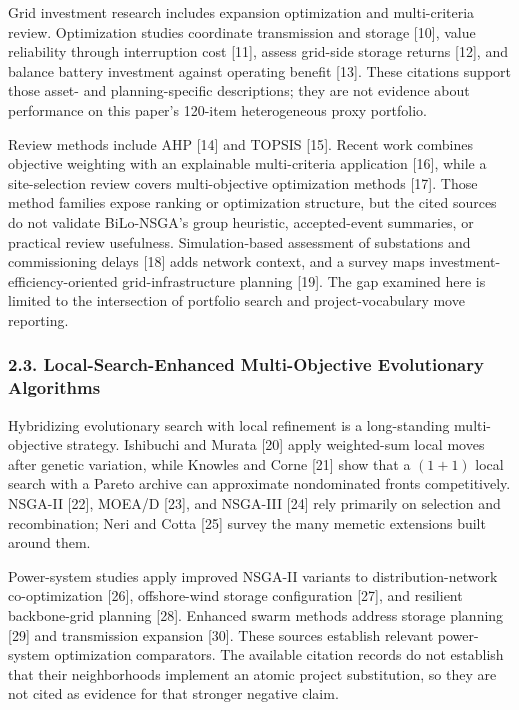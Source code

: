 \documentclass[
]{article}
\begin{document}
Grid investment research includes expansion optimization and multi-criteria review. Optimization studies coordinate transmission and storage {[}10{]}, value reliability through interruption cost {[}11{]}, assess grid-side storage returns {[}12{]}, and balance battery investment against operating benefit {[}13{]}. These citations support those asset- and planning-specific descriptions; they are not evidence about performance on this paper's 120-item heterogeneous proxy portfolio.

Review methods include AHP {[}14{]} and TOPSIS {[}15{]}. Recent work combines objective weighting with an explainable multi-criteria application {[}16{]}, while a site-selection review covers multi-objective optimization methods {[}17{]}. Those method families expose ranking or optimization structure, but the cited sources do not validate BiLo-NSGA's group heuristic, accepted-event summaries, or practical review usefulness. Simulation-based assessment of substations and commissioning delays {[}18{]} adds network context, and a survey maps investment-efficiency-oriented grid-infrastructure planning {[}19{]}. The gap examined here is limited to the intersection of portfolio search and project-vocabulary move reporting.

\subsubsection{2.3. Local-Search-Enhanced Multi-Objective Evolutionary Algorithms}\label{local-search-enhanced-multi-objective-evolutionary-algorithms}

Hybridizing evolutionary search with local refinement is a long-standing multi-objective strategy. Ishibuchi and Murata {[}20{]} apply weighted-sum local moves after genetic variation, while Knowles and Corne {[}21{]} show that a \((1+1)\) local search with a Pareto archive can approximate nondominated fronts competitively. NSGA-II {[}22{]}, MOEA/D {[}23{]}, and NSGA-III {[}24{]} rely primarily on selection and recombination; Neri and Cotta {[}25{]} survey the many memetic extensions built around them.

Power-system studies apply improved NSGA-II variants to distribution-network co-optimization {[}26{]}, offshore-wind storage configuration {[}27{]}, and resilient backbone-grid planning {[}28{]}. Enhanced swarm methods address storage planning {[}29{]} and transmission expansion {[}30{]}. These sources establish relevant power-system optimization comparators. The available citation records do not establish that their neighborhoods implement an atomic project substitution, so they are not cited as evidence for that stronger negative claim.
\end{document}
